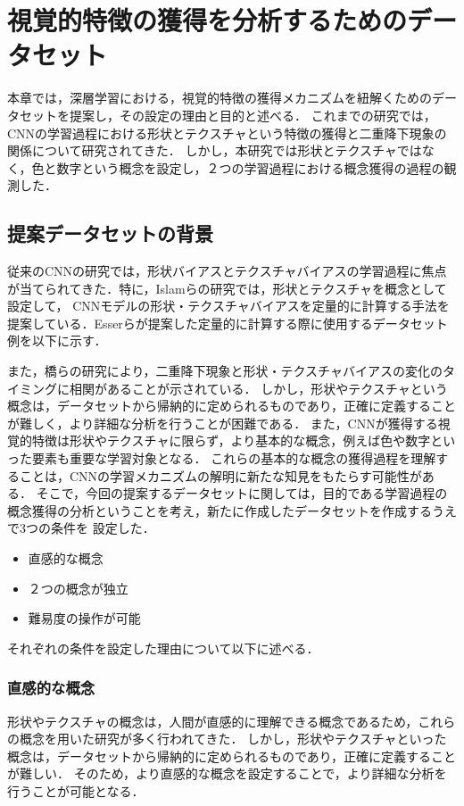 \chapter{視覚的特徴の獲得を分析するためのデータセット}
\label{chap:experiment_settings}
本章では，深層学習における，視覚的特徴の獲得メカニズムを紐解くためのデータセットを提案し，その設定の理由と目的と述べる．
これまでの研究では，CNNの学習過程における形状とテクスチャという特徴の獲得と二重降下現象の関係について研究されてきた．
しかし，本研究では形状とテクスチャではなく，色と数字という概念を設定し，２つの学習過程における概念獲得の過程の観測した．

\section{提案データセットの背景}
従来のCNNの研究では，形状バイアスとテクスチャバイアスの学習過程に焦点が当てられてきた．特に，Islamらの研究では，形状とテクスチャを概念として設定して，
CNNモデルの形状・テクスチャバイアスを定量的に計算する手法を提案している．Esserらが提案した定量的に計算する際に使用するデータセット例を以下に示す．


また，橋らの研究により，二重降下現象と形状・テクスチャバイアスの変化のタイミングに相関があることが示されている．
しかし，形状やテクスチャという概念は，データセットから帰納的に定められるものであり，正確に定義することが難しく，より詳細な分析を行うことが困難である．
また，CNNが獲得する視覚的特徴は形状やテクスチャに限らず，より基本的な概念，例えば色や数字といった要素も重要な学習対象となる．
これらの基本的な概念の獲得過程を理解することは，CNNの学習メカニズムの解明に新たな知見をもたらす可能性がある．
そこで，今回の提案するデータセットに関しては，目的である学習過程の概念獲得の分析ということを考え，新たに作成したデータセットを作成するうえで3つの条件を
設定した．

\begin{itemize}
    \item 直感的な概念
    \item ２つの概念が独立
    \item 難易度の操作が可能
\end{itemize}

それぞれの条件を設定した理由について以下に述べる．

\subsection{直感的な概念}
形状やテクスチャの概念は，人間が直感的に理解できる概念であるため，これらの概念を用いた研究が多く行われてきた．
しかし，形状やテクスチャといった概念は，データセットから帰納的に定められるものであり，正確に定義することが難しい．
そのため，より直感的な概念を設定することで，より詳細な分析を行うことが可能となる．

